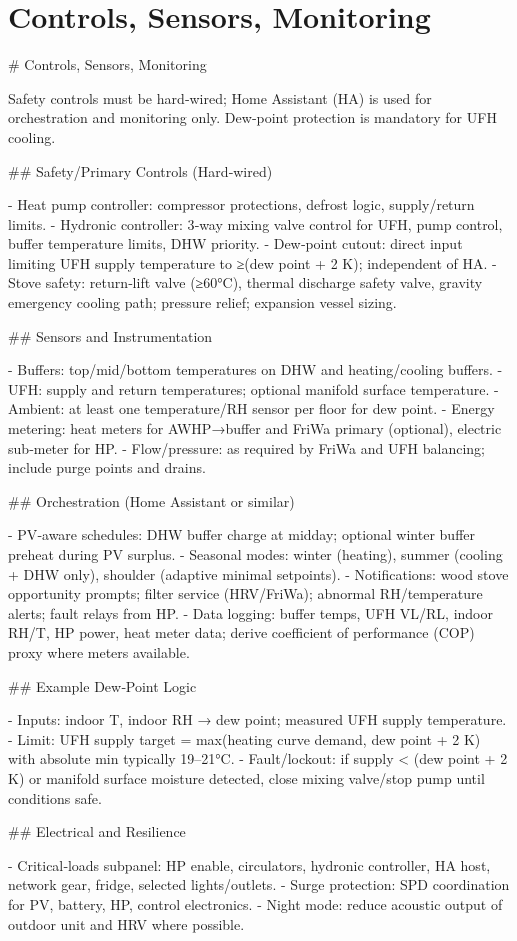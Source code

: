 \documentclass[11pt,oneside]{report}
\begin{document}
\chapter{Controls, Sensors, Monitoring}
\begin{markdown}
# Controls, Sensors, Monitoring

Safety controls must be hard‑wired; Home Assistant (HA) is used for orchestration and monitoring only. Dew‑point protection is mandatory for UFH cooling.

## Safety/Primary Controls (Hard‑wired)

- Heat pump controller: compressor protections, defrost logic, supply/return limits.
- Hydronic controller: 3‑way mixing valve control for UFH, pump control, buffer temperature limits, DHW priority.
- Dew‑point cutout: direct input limiting UFH supply temperature to ≥(dew point + 2 K); independent of HA.
- Stove safety: return‑lift valve (≥60°C), thermal discharge safety valve, gravity emergency cooling path; pressure relief; expansion vessel sizing.

## Sensors and Instrumentation

- Buffers: top/mid/bottom temperatures on DHW and heating/cooling buffers.
- UFH: supply and return temperatures; optional manifold surface temperature.
- Ambient: at least one temperature/RH sensor per floor for dew point.
- Energy metering: heat meters for AWHP→buffer and FriWa primary (optional), electric sub‑meter for HP.
- Flow/pressure: as required by FriWa and UFH balancing; include purge points and drains.

## Orchestration (Home Assistant or similar)

- PV‑aware schedules: DHW buffer charge at midday; optional winter buffer preheat during PV surplus.
- Seasonal modes: winter (heating), summer (cooling + DHW only), shoulder (adaptive minimal setpoints).
- Notifications: wood stove opportunity prompts; filter service (HRV/FriWa); abnormal RH/temperature alerts; fault relays from HP.
- Data logging: buffer temps, UFH VL/RL, indoor RH/T, HP power, heat meter data; derive coefficient of performance (COP) proxy where meters available.

## Example Dew‑Point Logic

- Inputs: indoor T, indoor RH → dew point; measured UFH supply temperature.
- Limit: UFH supply target = max(heating curve demand, dew point + 2 K) with absolute min typically 19–21°C.
- Fault/lockout: if supply < (dew point + 2 K) or manifold surface moisture detected, close mixing valve/stop pump until conditions safe.

## Electrical and Resilience

- Critical‑loads subpanel: HP enable, circulators, hydronic controller, HA host, network gear, fridge, selected lights/outlets.
- Surge protection: SPD coordination for PV, battery, HP, control electronics.
- Night mode: reduce acoustic output of outdoor unit and HRV where possible.
\end{markdown}
\end{document}
